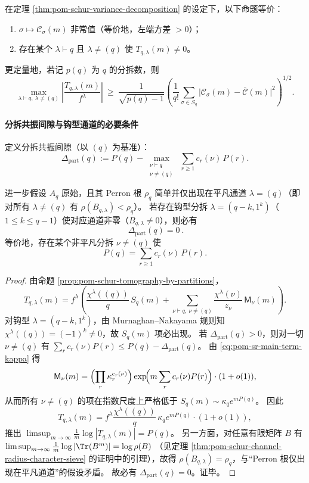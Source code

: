\begin{corollary}\label{cor:pom-schur-nontrivial-channel-activation}
在定理 \ref{thm:pom-schur-variance-decomposition} 的设定下，以下命题等价：
\begin{enumerate}
  \item \(\sigma\mapsto \mathcal C_\sigma(m)\) 非常值（等价地，左端方差 \(>0\)）；
  \item 存在某个 \(\lambda\vdash q\) 且 \(\lambda\ne(q)\) 使 \(T_{q,\lambda}(m)\ne 0\)。
\end{enumerate}
更定量地，若记 \(p(q)\) 为 \(q\) 的分拆数，则
\[
\max_{\lambda\vdash q,\ \lambda\ne(q)}\left|\frac{T_{q,\lambda}(m)}{f^\lambda}\right|
\ \ge\
\frac{1}{\sqrt{p(q)-1}}\left(\frac{1}{q!}\sum_{\sigma\in S_q}\bigl|\mathcal{C}_\sigma(m)-\overline{\mathcal C}(m)\bigr|^2\right)^{1/2}.
\]
\end{corollary}

\paragraph{分拆共振间隙与钩型通道的必要条件}
定义分拆共振间隙（以 \((q)\) 为基准）：
\[
\Delta_{\mathrm{part}}(q)
:=
P(q)-\max_{\substack{\nu\vdash q\\ \nu\neq (q)}}\ \sum_{r\ge 1}c_r(\nu)\,P(r).
\]

\begin{theorem}[钩型通道 \texorpdfstring{$\Rightarrow$}{=>} 共振间隙闭合]\label{thm:pom-hook-channel-implies-partition-gap-closed}
进一步假设 \(A_q\) 原始，且其 Perron 根 \(\rho_q\) 简单并仅出现在平凡通道 \(\lambda=(q)\)（即对所有 \(\lambda\neq(q)\) 有 \(\rho(B_{q,\lambda})<\rho_q\)）。
若存在钩型分拆 \(\lambda=(q-k,1^k)\)（\(1\le k\le q-1\)）使对应通道非零（\(B_{q,\lambda}\neq 0\)），则必有
\[
\boxed{\ \Delta_{\mathrm{part}}(q)=0\ }.
\]
等价地，存在某个非平凡分拆 \(\nu\neq(q)\) 使
\[
P(q)=\sum_{r\ge 1}c_r(\nu)\,P(r).
\]
\end{theorem}
\begin{proof}
由命题 \ref{prop:pom-schur-tomography-by-partitions}，
\[
T_{q,\lambda}(m)
=
f^\lambda\left(\frac{\chi^\lambda((q))}{q}\,S_q(m)+\sum_{\nu\vdash q,\ \nu\neq(q)}\frac{\chi^\lambda(\nu)}{z_\nu}\,\mathsf{M}_\nu(m)\right).
\]
对钩型 \(\lambda=(q-k,1^k)\)，由 Murnaghan--Nakayama 规则知 \(\chi^\lambda((q))=(-1)^k\neq 0\)，故 \(S_q(m)\) 项必出现。
若 \(\Delta_{\mathrm{part}}(q)>0\)，则对一切 \(\nu\neq(q)\) 有
\(
\sum_r c_r(\nu)P(r)\le P(q)-\Delta_{\mathrm{part}}(q)
\)。
由 \eqref{eq:pom-sr-main-term-kappa} 得
\[
\mathsf{M}_\nu(m)
=
\Bigl(\prod_r \kappa_r^{c_r(\nu)}\Bigr)\exp\!\Bigl(m\sum_r c_r(\nu)P(r)\Bigr)\cdot(1+o(1)),
\]
从而所有 \(\nu\neq(q)\) 的项在指数尺度上严格低于 \(S_q(m)\sim \kappa_q e^{mP(q)}\)。
因此
\[
T_{q,\lambda}(m)
=
f^\lambda\frac{\chi^\lambda((q))}{q}\,\kappa_q e^{mP(q)}\cdot(1+o(1)),
\]
推出
\(
\limsup_{m\to\infty}\frac{1}{m}\log|T_{q,\lambda}(m)|=P(q)
\)。
另一方面，对任意有限矩阵 \(B\) 有
\(
\limsup_{m\to\infty}\frac{1}{m}\log|\Tr(B^m)|=\log\rho(B)
\)
（见定理 \ref{thm:pom-schur-channel-radius-character-sieve} 的证明中的引理），故得 \(\rho(B_{q,\lambda})=\rho_q\)，与“Perron 根仅出现在平凡通道”的假设矛盾。
故必有 \(\Delta_{\mathrm{part}}(q)=0\)。证毕。
\end{proof}

